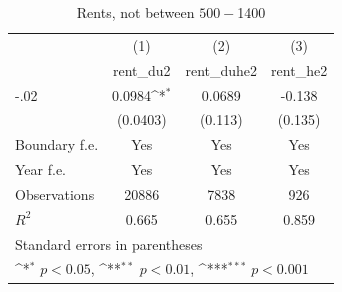 \begin{table}[htbp]\centering
\def\sym#1{\ifmmode^{#1}\else\(^{#1}\)\fi}
\caption{Rents, not between $500 - $1400}
\begin{tabular}{l*{3}{c}}
\hline\hline
                    &\multicolumn{1}{c}{(1)}&\multicolumn{1}{c}{(2)}&\multicolumn{1}{c}{(3)}\\
                    &\multicolumn{1}{c}{rent\_du2}&\multicolumn{1}{c}{rent\_duhe2}&\multicolumn{1}{c}{rent\_he2}\\
\hline
-.02                &      0.0984\sym{*}  &      0.0689         &      -0.138         \\
                    &    (0.0403)         &     (0.113)         &     (0.135)         \\
[1em]
Boundary f.e.       &         Yes         &         Yes         &         Yes         \\
[1em]
Year f.e.           &         Yes         &         Yes         &         Yes         \\
\hline
Observations        &       20886         &        7838         &         926         \\
\(R^{2}\)           &       0.665         &       0.655         &       0.859         \\
\hline\hline
\multicolumn{4}{l}{\footnotesize Standard errors in parentheses}\\
\multicolumn{4}{l}{\footnotesize \sym{*} \(p<0.05\), \sym{**} \(p<0.01\), \sym{***} \(p<0.001\)}\\
\end{tabular}
\end{table}
